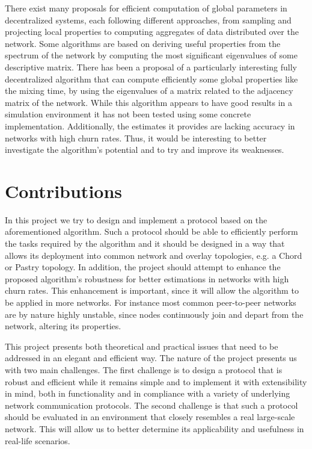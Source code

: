 \documentclass[MSc]{icldt}
\begin{document}
There exist many proposals for efficient computation of global parameters in decentralized systems, each following different approaches, from sampling and projecting local properties to computing aggregates of data distributed over the network. Some algorithms are based on deriving useful properties from the spectrum of the network by computing the most significant eigenvalues of some descriptive matrix. There has been a proposal of a particularly interesting fully decentralized algorithm \cite{6195806} that can compute efficiently some global properties like the mixing time, by using the eigenvalues of a matrix related to the adjacency matrix of the network. While this algorithm appears to have good results in a simulation environment it has not been tested using some concrete implementation. Additionally, the estimates it provides are lacking accuracy in networks with high churn rates. Thus, it would be interesting to better investigate the algorithm's potential and to try and improve its weaknesses.


\section{Contributions}

In this project we try to design and implement a protocol based on the aforementioned algorithm. Such a protocol should be able to efficiently perform the tasks required by the algorithm and it should be designed in a way that allows its deployment into common network and overlay topologies, e.g. a Chord or Pastry topology. In addition, the project should attempt to enhance the proposed algorithm's robustness for better estimations in networks with high churn rates. This enhancement is important, since it will allow the algorithm to be applied in more networks. For instance most common peer-to-peer networks are by nature highly unstable, since nodes continuously join and depart from the network, altering its properties.

This project presents both theoretical and practical issues that need to be addressed in an elegant and efficient way. The nature of the project presents us with two main challenges. The first challenge is to design a protocol that is robust and efficient while it remains simple and to implement it with extensibility in mind, both in functionality and in compliance with a variety of underlying network communication protocols. The second challenge is that such a protocol should be evaluated in an environment that closely resembles a real large-scale network. This will allow us to better determine its applicability and usefulness in real-life scenarios.
\end{document}
